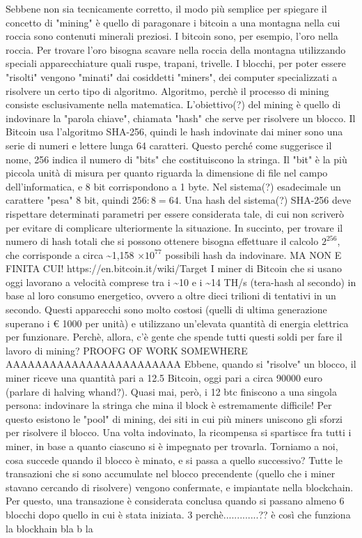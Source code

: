 \documentclass {article}
\begin{document}
Sebbene non sia tecnicamente corretto, il modo più semplice per spiegare il concetto di "mining" è quello di paragonare i bitcoin a una montagna nella cui roccia sono contenuti minerali preziosi.
I bitcoin sono, per esempio, l'oro nella roccia.
Per trovare l'oro bisogna scavare nella roccia della montagna utilizzando speciali apparecchiature quali ruspe, trapani, trivelle.
I blocchi, per poter essere "risolti" vengono "minati" dai cosiddetti "miners", dei computer specializzati a risolvere un certo tipo di algoritmo.
Algoritmo, perchè il processo di mining consiste esclusivamente nella matematica.
L'obiettivo(?) del mining è quello di indovinare la "parola chiave", chiamata "hash" che serve per risolvere un blocco.
Il Bitcoin usa l'algoritmo SHA-256, quindi le hash indovinate dai miner sono una serie di numeri e lettere lunga 64 caratteri. Questo perché come suggerisce il nome, 256 indica il numero di "bits" che costituiscono la stringa.
Il "bit" è la più piccola unità di misura per quanto riguarda la dimensione di file nel campo dell'informatica, e 8 bit corrispondono a 1 byte.
Nel sistema(?) esadecimale un carattere "pesa" 8 bit, quindi $256 : 8 = 64$.
Una hash del sistema(?) SHA-256 deve rispettare determinati parametri per essere considerata tale, di cui non scriverò per evitare di complicare ulteriormente la situazione.
In succinto, per trovare il numero di hash totali che si possono ottenere bisogna effettuare il  calcolo $2^{256}$, che corrisponde a circa \textasciitilde 1,158 $\times 10^{77}$ possibili hash da indovinare.
MA NON E FINITA CUI! https://en.bitcoin.it/wiki/Target
I miner di Bitcoin che si usano oggi lavorano a velocità comprese tra i \textasciitilde 10 e i \textasciitilde 14 TH/s (tera-hash al secondo) in base al loro consumo energetico, ovvero a oltre dieci trilioni di tentativi in un secondo.
Questi apparecchi sono molto costosi (quelli di ultima generazione superano i \euro{} 1000 per unità) e utilizzano un'elevata quantità di energia elettrica per funzionare.
Perchè, allora, c'è gente che spende tutti questi soldi per fare il lavoro di mining? PROOFG  OF WORK SOMEWHERE AAAAAAAAAAAAAAAAAAAAAAAA
Ebbene, quando si "risolve" un blocco, il miner riceve una quantità pari a 12.5 Bitcoin, oggi pari a circa 90000 euro (parlare di halving whand?).
Quasi mai, però, i 12 btc finiscono a una singola persona: indovinare la stringa che mina il block è estremamente difficile!
Per questo esistono le "pool" di mining, dei siti in cui più miners uniscono gli sforzi per risolvere il blocco.
Una volta indovinato, la ricompensa si spartisce fra tutti i miner, in base a quanto ciascuno si è impegnato per trovarla.
Torniamo a noi, cosa succede quando il blocco è minato, e si passa a quello successivo? Tutte le transazioni che si sono accumulate nel blocco precendente (quello che i miner stavano cercando di risolvere) vengono confermate, e impiantate nella blockchain. Per questo, una transazione è considerata conclusa quando si passano almeno 6 blocchi dopo quello in cui è stata iniziata.
3 perchè.............??
è così che funziona la blockhain bla b la
\end{document}

